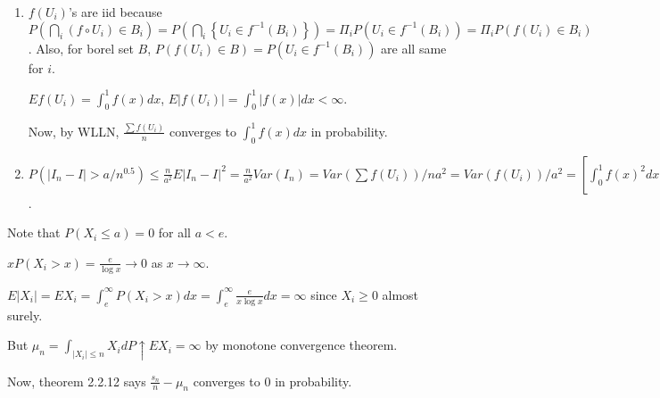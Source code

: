 \begin{problem}[2.2.3] \hfill

	\begin{enumerate}[label = (\alph*)]
		\item $f(U_i)$'s are iid because $P\left( \bigcap_{i} \left( f\circ U_i \right) \in B_i \right) = P\left( \bigcap_i \left\{ U_i \in f^{-1}(B_i) \right\} \right) = \Pi_i P\left( U_i \in f^{-1}(B_i) \right) = \Pi_i P\left( f(U_i) \in B_i \right)$.
			Also, for borel set $B$, $P\left( f(U_i) \in B \right) = P\left( U_i \in f^{-1}(B_i) \right)$ are all same for $i$.

			$Ef(U_i) = \int_0^1 f(x)dx$, $E|f(U_i)| = \int_0^1 |f(x)|dx < \infty$. 

			Now, by WLLN, $\frac{\sum f(U_i)}{n}$ converges to $\int_0^1 f(x)dx$ in probability.

		\item $P\left( |I_n -I | > a/n^{0.5} \right) \leq \frac{n}{a^2} E|I_n -I|^2 = \frac{n}{a^2}Var(I_n) = Var(\sum f(U_i)) / na^2 = Var(f(U_i))/a^2 = \left[ \int_0^1 f(x)^2 dx - \left( \int_0^1 f(x)dx \right)^2 \right]/a^2$.
\end{enumerate}


\end{problem}

\begin{problem}[2.2.5] \hfill

	Note that $P(X_i \leq a) = 0$ for all $a <e$.

	$xP(X_i > x) = \frac{e}{\log x} \rightarrow 0$ as $x \rightarrow \infty$. 

	$E|X_i| = EX_i = \int_e^\infty P(X_i >x) dx = \int_e^\infty \frac{e}{x \log x} dx = \infty$ since $X_i \geq 0$ almost surely.

	But $\mu_n = \int_{|X_i| \leq n} X_i dP \uparrow EX_i = \infty$ by monotone convergence theorem.

	Now, theorem 2.2.12 says $\frac{s_n}{n} - \mu_n$ converges to $0$ in probability.
	
\end{problem}
